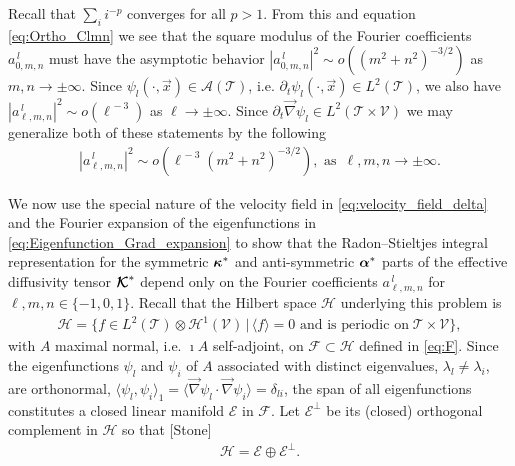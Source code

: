 \documentclass{article}
\newcommand\bkappa{\mbox{\boldmath${\kappa}$}}
\newcommand\balpha{\mbox{\boldmath${\alpha}$}}
\newcommand\Kbc{\mbox{\boldmath${\mathcal{K}}$}}
\newcommand{\Hc}{\mathcal{H}}
\newcommand{\Ac}{\mathcal{A}}
\newcommand{\Tc}{\mathcal{T}}
\newcommand{\Vc}{\mathcal{V}}
\newcommand{\Fc}{\mathcal{F}}
\newcommand{\Ec}{\mathcal{E}}
\newcommand{\0}{\mathbf{0}}
\newcommand{\1}{\mathbf{1}}
\newcommand{\2}{\mathbf{2}}
\newcommand{\3}{\mathbf{3}}
\newcommand{\4}{\mathbf{4}}
\newcommand{\5}{\mathbf{5}}
\newcommand{\6}{\mathbf{6}}
\newcommand{\7}{\mathbf{7}}
\newcommand{\8}{\mathbf{8}}
\begin{document}
Recall that $\sum_ii^{-p}$ converges for all $p>1$. From this and
equation \eqref{eq:Ortho_Clmn} we see that the square modulus of the  
Fourier coefficients $a^{\,l}_{0,m,n}$ must have the asymptotic behavior 
$|a^{\,l}_{0,m,n}|^2\sim o((m^2+n^2)^{-3/2})$ as $m,n\to\pm\infty$. Since
$\psi_l(\cdot,\vec{x})\in\Ac(\Tc)$, i.e. $\partial_t\psi_l(\cdot,\vec{x})\in L^2(\Tc)$, we also
have $|a^{\,l}_{\ell,m,n}|^2\sim o(\ell^{\,-3})$ as $\ell\to\pm\infty$. Since
$\partial_t\vec{\nabla}\psi_l\in L^2(\Tc\times\Vc)$ we may generalize 
both of these statements by the following
%
\begin{align}\label{eq:Clmn_assymptotics}
  |a^{\,l}_{\ell,m,n}|^2\sim o(\ell^{\,-3}(m^2+n^2)^{-3/2}), \text{ as } \,\ell,m,n\to\pm\infty.
\end{align}
%



We now use the special nature of the velocity field in \eqref{eq:velocity_field_delta}
and the Fourier expansion of the eigenfunctions in
\eqref{eq:Eigenfunction_Grad_expansion} to show that the
Radon--Stieltjes integral representation for the symmetric $\bkappa^*$
and anti-symmetric $\balpha^*$ parts of the effective diffusivity
tensor $\Kbc^*$ depend only on the Fourier coefficients
$a^{\,l}_{\ell,m,n}$ for $\ell,m,n\in\{-1,0,1\}$. Recall that the Hilbert space
$\Hc$ underlying this problem is
%
\begin{align}\label{eq:Hilbert_Space}
  \Hc=\{f\in L^2(\Tc)\otimes\Hc^1(\Vc) \,|\, \langle f\rangle=0 \text{ and is periodic on}\; \Tc\times\Vc\}, 
\end{align}
% 
with $A$ maximal normal, i.e. $\imath A$ self-adjoint, on $\Fc\subset\Hc$ defined
in \eqref{eq:F}. Since the eigenfunctions $\psi_l$ and $\psi_i$ of $A$
associated with distinct eigenvalues, $\lambda_l\neq\lambda_i$, are orthonormal,
$\langle\psi_l,\psi_i\rangle_1=\langle\vec{\nabla}\psi_l\cdot\vec{\nabla}\psi_i\rangle=\delta_{li}$, the span of all
eigenfunctions constitutes a closed linear manifold $\Ec$ in
$\Fc$. Let $\Ec^\perp$ be its (closed) orthogonal complement in $\Hc$
so that [Stone]
\begin{align}\label{eq:Hilbert_Space_Decomposition}
  \Hc=\Ec\oplus\Ec^\perp.
\end{align}
%
\end{document}
